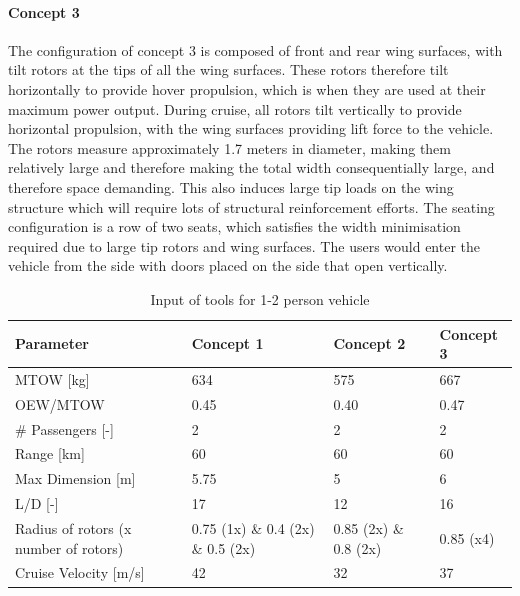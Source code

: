 \paragraph{Concept 3}
The configuration of concept 3 is composed of front and rear wing surfaces, with tilt rotors at the tips of all the wing surfaces. These rotors therefore tilt horizontally to provide hover propulsion, which is when they are used at their maximum power output. During cruise, all rotors tilt vertically to provide horizontal propulsion, with the wing surfaces providing lift force to the vehicle. The rotors measure approximately 1.7 meters in diameter, making them relatively large and therefore making the total width consequentially large, and therefore space demanding. This also induces large tip loads on the wing structure which will require lots of structural reinforcement efforts. The seating configuration is a row of two seats, which satisfies the width minimisation required due to large tip rotors and wing surfaces. The users would enter the vehicle from the side with doors placed on the side that open vertically.  

\begin{table}[H]
\captionsetup{justification=centering}
\caption{Input of tools for 1-2 person vehicle}
\label{12input}
\begin{tabular}{@{}llll@{}}
\toprule
\textbf{Parameter}                       & \textbf{Concept 1} & \textbf{Concept 2} & \textbf{Concept 3} \\ \midrule
MTOW {[}kg{]}                            &           634         &        575           &         667           \\
OEW/MTOW           &          0.45          &         0.40          &             0.47       \\
\# Passengers {[}-{]}                    &          2          &         2           &             2       \\
Range {[}km{]}                           &          60          &         60     &            60        \\
Max Dimension {[}m{]}                    &         5.75           &          5          &            6        \\
L/D {[}-{]}                              &           17         &        12            &           16         \\
Radius of rotors (x number of rotors) &   0.75 (1x) \& 0.4 (2x) \& 0.5 (2x)                &    0.85 (2x) \& 0.8 (2x)&            0.85 (x4)       \\
Cruise Velocity {[}m/s{]}                &          42          &        32            &            37        \\ \bottomrule
\end{tabular}

\end{table}


